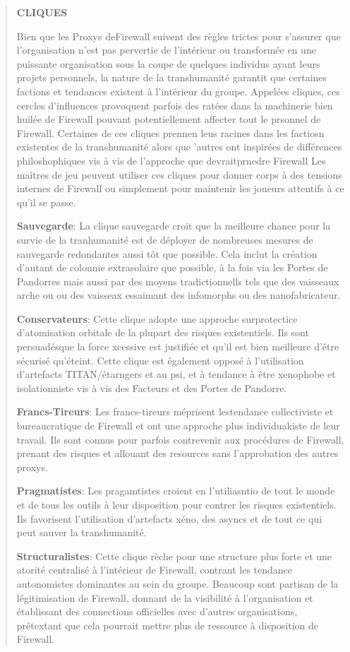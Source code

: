 \begin{quotation} \begin{large} \textbf{CLIQUES} \end{large} 

Bien que les Proxys deFirewall suivent des règles trictes pour s'assurer que l'organisation n'est pas pervertie de l'intérieur ou transformée en une puissante organisation sous la coupe de quelques individus ayant leurs projets personnels, la nature de la transhumanité garantit que certaines factions et tendances existent à l'intérieur du groupe. Appelées cliques, ces cercles d'influences provoquent parfois des ratées dans la machinerie bien huilée de Firewall pouvant potentiellement affecter tout le prsonnel de Firewall. Certaines de ces cliques prennen leus racines dans les factiosn existentes de la transhumanité alors que 'autres ont inspirées de différences philoshophiques vis à vis de l'approche que devraitprnedre Firewall Les maîtres de jeu peuvent utiliser ces cliques pour donner corps à des tensions internes de Firewall ou simplement pour maintenir les joueurs attentifs à ce qu'il se passe. 

\textbf{Sauvegarde}: La clique sauvegarde croit que la meilleure chance pour la survie de la tranhumanité est de déployer de nombreuses mesures de sauvegarde redondantes aussi tôt que possible. Cela inclut la création d'autant de colonnie extrasolaire que possible, à la fois via les Portes de Pandorres mais aussi par des moyens tradictionnells tels que des vaisseaux arche ou ou des vaisseax essaimant des infomorphs ou des nanofabricateur. 

\textbf{Conservateurs}: Cette clique adopte une approche surprotectice d'atomisation orbitale de la plupart des risques existentiels. Ils sont persuadésque la force xcessive est justifiée et qu'il est bien meilleure d'être sécurisé qu'éteint. Cette clique est également opposé à l'utilisation d'artefacts TITAN/étarngers et au psi, et à tendance à être xenophobe et isolationniste vis à vis des Facteurs et des Portes de Pandorre. 

\textbf{Francs-Tireurs}: Les francs-tireurs méprisent lestendance collectiviste et bureaucratique de Firewall et ont une approche plus individuakiste de leur travail. Ils sont connus pour parfois contrevenir aux procédures de Firewall, prenant des risques et allouant des resources sans l'approbation des autres proxys. 

\textbf{Pragmatistes}: Les pragamtistes croient en l'utiliasntio de tout le monde et de tous les outils à leur disposition pour contrer les risques existentiels. Ils favorisent l'utilisation d'artefacts xéno, des asyncs et de tout ce qui peut sauver la transhumanité. 

\textbf{Structuralistes}: Cette clique rèche pour une structure plus forte et une atorité centralisé à l'intérieur de Firewall, contrant les tendance autonomistes dominantes au sein du groupe. Beaucoup sont partisan de la légitimisation de Firewall, donnant de la visibilité à l'organisation et établissant des connections officielles avec d'autres organisations, prétextant que cela pourrait mettre plus de ressource à disposition de Firewall. \end{quotation} 

